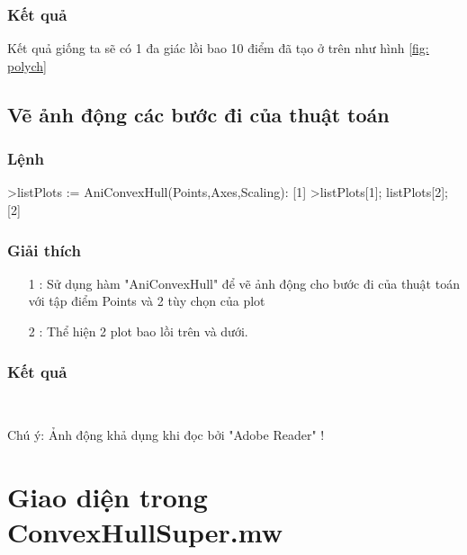 \documentclass[12pt]{article}
\begin{document}
            \subsubsection*{Kết quả}
              Kết quả giống ta sẽ có 1 đa giác lồi bao 10 điểm đã tạo ở trên như hình \ref{fig: polych}
              \newpage
        \subsection*{Vẽ ảnh động các bước đi của thuật toán}
          \subsubsection*{Lệnh}
            \begin{spverbatim}
    >listPlots := AniConvexHull(Points,Axes,Scaling):  [1]
    >listPlots[1]; listPlots[2]; [2]
            \end{spverbatim}
          \subsubsection*{Giải thích}
            \begin{itemize}
              \item [1]: Sử dụng hàm "AniConvexHull" để vẽ ảnh động cho bước đi của thuật toán với tập điểm Points và 2 tùy chọn của plot
              \item [2]: Thể hiện 2 plot bao lồi trên và dưới.
            \end{itemize}
        \subsubsection*{Kết quả}
          \begin{frame}{}
            \centering
          \end{frame}
          \\
          \begin{center}
            Chú ý: Ảnh động khả dụng khi đọc bởi "Adobe Reader" !
          \end{center}
        \newpage
    \section{Giao diện trong ConvexHullSuper.mw}
\end{document}
